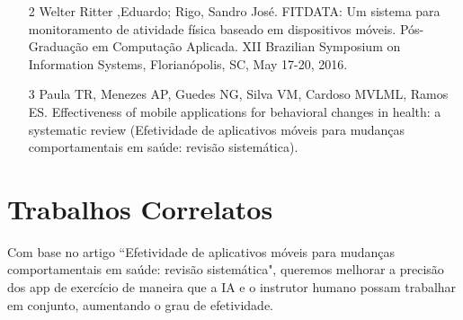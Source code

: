 \documentclass[conference]{IEEEtran}
\begin{document}
\begin{itemize}
\item [2] Welter Ritter ,Eduardo; Rigo, Sandro José. FITDATA: Um sistema para monitoramento de atividade física baseado em dispositivos móveis. Pós-Graduação em Computação Aplicada.  XII Brazilian Symposium on Information Systems, Florianópolis, SC, May 17-20, 2016.
\end{itemize}

\begin{itemize}
\item [3] Paula TR, Menezes AP, Guedes NG, Silva VM, Cardoso MVLML, Ramos ES. Effectiveness of mobile applications for behavioral changes in
health: a systematic review (Efetividade de aplicativos móveis para mudanças comportamentais em saúde: revisão sistemática). 
\newline
\end{itemize}


\section{Trabalhos Correlatos}

Com base no artigo “Efetividade de aplicativos móveis para mudanças comportamentais em saúde: revisão sistemática", queremos melhorar a precisão dos app de exercício de maneira que a IA e o instrutor humano possam trabalhar em conjunto, aumentando o grau de efetividade.
\end{document}
